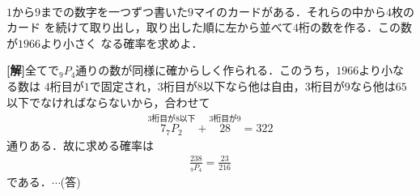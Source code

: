 \documentclass[a4j]{jarticle}
\begin{document}
　

     \begin{oframed}
     $1$から$9$までの数字を一つずつ書いた$9$マイのカードがある．それらの中から$4$枚のカード
     を続けて取り出し，取り出した順に左から並べて$4$桁の数を作る．この数が$1966$より小さく
     なる確率を求めよ．
     \end{oframed}

\setlength{\columnseprule}{0.4pt}
\begin{multicols}{2}
{\bf[解]}全てで${}_9P_4$通りの数が同様に確からしく作られる．このうち，$1966$より小なる数は
$4$桁目が$1$で固定され，$3$桁目が$8$以下なら他は自由，$3$桁目が$9$なら他は$65$以下でなければならないから，合わせて
     \begin{align*}
     \stackrel{3桁目が8以下}{7_7P_2}+\stackrel{3桁目が9}{28}=322
     \end{align*}
通りある．故に求める確率は
     \begin{align*}
     \frac{238}{{}_9P_4}=\frac{23}{216}
     \end{align*}
である．$\cdots$(答)     
\newpage
\end{multicols}
\end{document}
